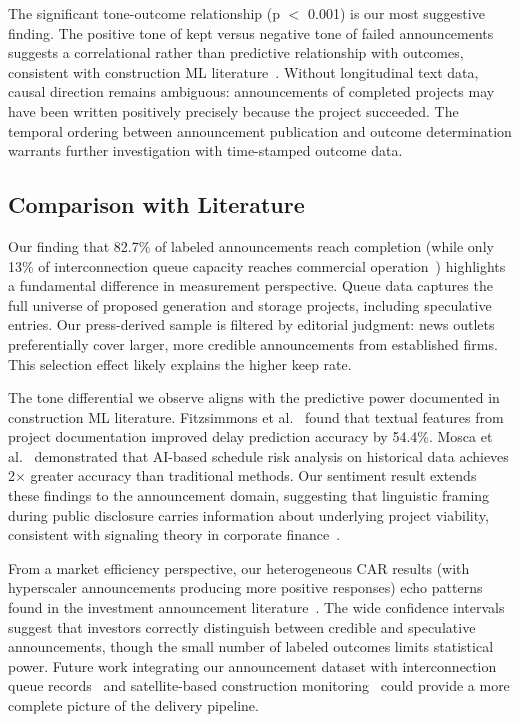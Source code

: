 \documentclass[5p,12pt]{elsarticle}
\begin{document}
The significant tone-outcome relationship (p $<$ 0.001) is our most suggestive finding. The positive tone of kept versus negative tone of failed announcements suggests a correlational rather than predictive relationship with outcomes, consistent with construction ML literature~\cite{Fitzsimmons2022Construction}. Without longitudinal text data, causal direction remains ambiguous: announcements of completed projects may have been written positively precisely because the project succeeded. The temporal ordering between announcement publication and outcome determination warrants further investigation with time-stamped outcome data.

\subsection*{Comparison with Literature}

Our finding that 82.7\% of labeled announcements reach completion (while only 13\% of interconnection queue capacity reaches commercial operation~\cite{Rand2025QueuedUp}) highlights a fundamental difference in measurement perspective. Queue data captures the full universe of proposed generation and storage projects, including speculative entries. Our press-derived sample is filtered by editorial judgment: news outlets preferentially cover larger, more credible announcements from established firms. This selection effect likely explains the higher keep rate.

The tone differential we observe aligns with the predictive power documented in construction ML literature. Fitzsimmons et al.~\cite{Fitzsimmons2022Construction} found that textual features from project documentation improved delay prediction accuracy by 54.4\%. Mosca et al.~\cite{Mosca2026AI} demonstrated that AI-based schedule risk analysis on historical data achieves 2$\times$ greater accuracy than traditional methods. Our sentiment result extends these findings to the announcement domain, suggesting that linguistic framing during public disclosure carries information about underlying project viability, consistent with signaling theory in corporate finance~\cite{Zarayeneh2026Multi}.

From a market efficiency perspective, our heterogeneous CAR results (with hyperscaler announcements producing more positive responses) echo patterns found in the investment announcement literature~\cite{MacKinlay1997Event}. The wide confidence intervals suggest that investors correctly distinguish between credible and speculative announcements, though the small number of labeled outcomes limits statistical power. Future work integrating our announcement dataset with interconnection queue records~\cite{Rand2025QueuedUp} and satellite-based construction monitoring~\cite{SynMax2026Satellite} could provide a more complete picture of the delivery pipeline.
\end{document}
